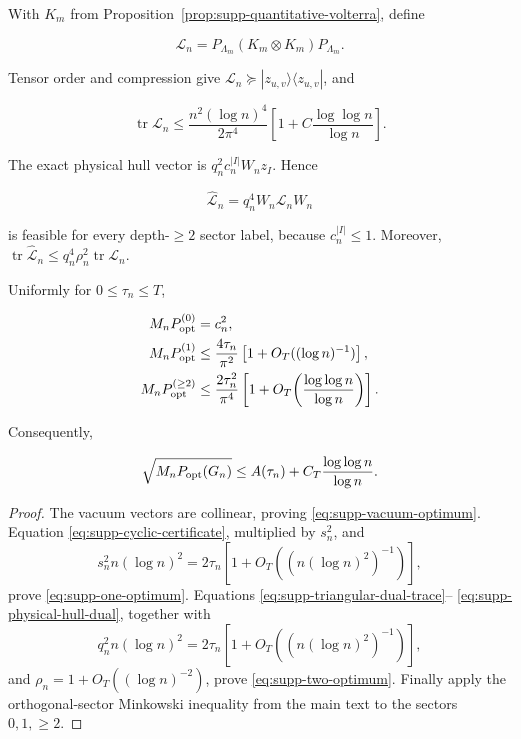 With \(K_m\) from Proposition~\ref{prop:supp-quantitative-volterra}, define

\begin{equation}\label{eq:supp-triangular-dual}
 \mathcal L_n=P_{\Lambda_m}(K_m\otimes K_m)P_{\Lambda_m}.
\end{equation}

Tensor order and compression give \(\mathcal L_n\succeq|z_{u,v}\rangle\langle
z_{u,v}|\), and

\begin{equation}\label{eq:supp-triangular-dual-trace}
 \operatorname{tr}\mathcal L_n
 \le\frac{n^2(\log n)^4}{2\pi^4}
 \left[1+C\frac{\log\log n}{\log n}\right].
\end{equation}

The exact physical hull vector is
\(q_n^2c_n^{|I|}W_nz_I\).  Hence

\begin{equation}\label{eq:supp-physical-hull-dual}
 \widehat{\mathcal L}_n=q_n^4W_n\mathcal L_nW_n
\end{equation}

is feasible for every depth-\(\ge2\) sector label, because
\(c_n^{|I|}\le1\).  Moreover,
\(\operatorname{tr}\widehat{\mathcal L}_n
\le q_n^4\rho_n^2\operatorname{tr}\mathcal L_n\).

\begin{theorem}
\label{thm:supp-sector-upper}
Uniformly for \(0\le\tau_n\le T\),

\begin{align}
 M_nP_{\rm opt}^{(0)}&=c_n^2,\label{eq:supp-vacuum-optimum}\\
 M_nP_{\rm opt}^{(1)}
 &\le\frac{4\tau_n}{\pi^2}
 \left[1+O_T((\log n)^{-1})\right],
 \label{eq:supp-one-optimum}\\
 M_nP_{\rm opt}^{(\ge2)}
 &\le\frac{2\tau_n^2}{\pi^4}
 \left[1+O_T\!\left(\frac{\log\log n}{\log n}\right)\right].
 \label{eq:supp-two-optimum}
\end{align}

Consequently,

\begin{equation}\label{eq:supp-full-optimum-upper}
 \sqrt{M_nP_{\rm opt}(G_n)}
 \le A(\tau_n)+C_T\frac{\log\log n}{\log n}.
\end{equation}
\end{theorem}

\begin{proof}
The vacuum vectors are collinear, proving \eqref{eq:supp-vacuum-optimum}.
Equation \eqref{eq:supp-cyclic-certificate}, multiplied by \(s_n^2\), and
\[
 s_n^2n(\log n)^2
 =2\tau_n\left[1+O_T\!\left((n(\log n)^2)^{-1}\right)\right],
\]
prove
\eqref{eq:supp-one-optimum}.  Equations
\eqref{eq:supp-triangular-dual-trace}--
\eqref{eq:supp-physical-hull-dual}, together with
\[
 q_n^2n(\log n)^2
 =2\tau_n\left[1+O_T\!\left((n(\log n)^2)^{-1}\right)\right],
\]
and
\(\rho_n=1+O_T((\log n)^{-2})\), prove
\eqref{eq:supp-two-optimum}.  Finally apply the orthogonal-sector Minkowski
inequality from the main text to the sectors \(0,1,\ge2\).
\end{proof}

